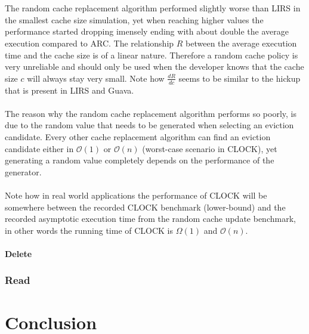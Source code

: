 \documentclass[pdftex,a4paper,12pt,twoside]{report}
\begin{document}
\\\\
The random cache replacement algorithm performed slightly worse than LIRS in the smallest cache size simulation, yet when reaching higher values the performance started dropping imensely ending with about double the average execution compared to ARC. The relationship $R$ between the average execution time and the cache size is of a linear nature. Therefore a random cache policy is very unreliable and should only be used when the developer knows that the cache size $c$ will always stay very small. Note how $\frac{dR}{dc}$ seems to be similar to the hickup that is present in LIRS and Guava.
\\\\
The reason why the random cache replacement algorithm performs so poorly, is due to the random value that needs to be generated when selecting an eviction candidate. Every other cache replacement algorithm can find an eviction candidate either in $\mathcal{O}(1)$ or $\mathcal{O}(n)$ (worst-case scenario in CLOCK), yet generating a random value completely depends on the performance of the generator.
\\\\
Note how in real world applications the performance of CLOCK will be somewhere between the recorded CLOCK benchmark (lower-bound) and the recorded asymptotic execution time from the random cache update benchmark, in other words the running time of CLOCK is $\Omega(1)$ and $\mathcal{O}(n)$.
\subsubsection{Delete}
\subsection{Read}

\chapter{Conclusion}
\label{ch:conclusion}

\lipsum[76-80]





\listoffigures
\listoftables
\end{document}
